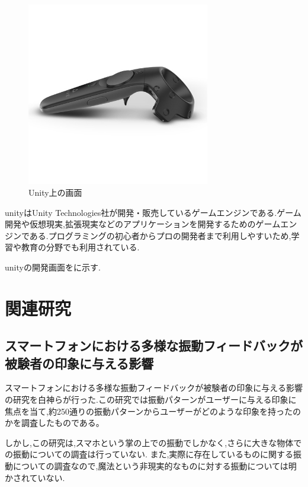 \begin{figure}[h]
\centering
\includegraphics[clip,width=8cm]{./fig/vivecontroller.png}
\caption{Unity上の画面}\label{unity}
\end{figure}

unity\cite{unity}はUnity Technologies社が開発・販売しているゲームエンジンである.ゲーム開発や仮想現実,拡張現実などのアプリケーションを開発するためのゲームエンジンである.プログラミングの初心者からプロの開発者まで利用しやすいため,学習や教育の分野でも利用されている.

unityの開発画面をに示す.

\section{関連研究}

\subsection{スマートフォンにおける多様な振動フィードバックが被験者の印象に与える影響}
スマートフォンにおける多様な振動フィードバックが被験者の印象に与える影響\cite{smart}の研究を白神らが行った.この研究では振動パターンがユーザーに与える印象に焦点を当て,約250通りの振動パターンからユーザーがどのような印象を持ったのかを調査したものである。


しかし,この研究は,スマホという掌の上での振動でしかなく,さらに大きな物体での振動についての調査は行っていない.
また,実際に存在しているものに関する振動についての調査なので,魔法という非現実的なものに対する振動については明かされていない.

